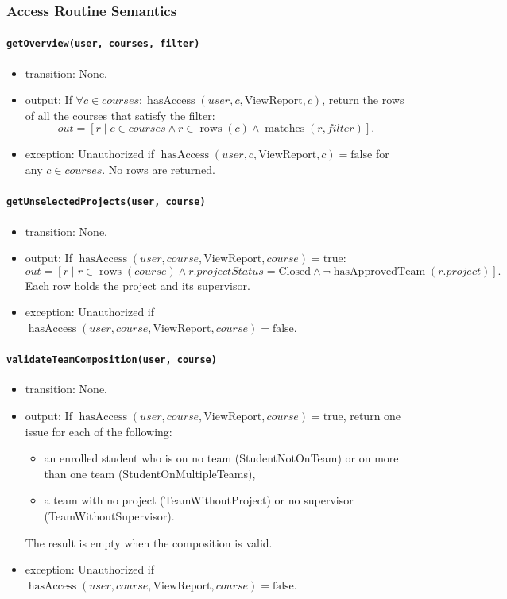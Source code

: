 \documentclass[12pt, titlepage]{article}
\begin{document}
\subsubsection{Access Routine Semantics}

\paragraph{\texttt{getOverview(user, courses, filter)}}
\begin{itemize}
    \item transition: None.
    \item output: If $\forall c\in courses:\operatorname{hasAccess}(user,c,\text{ViewReport},c)$,
    return the rows of all the courses that satisfy the filter:
    \[
        out=[r\mid c\in courses\land r\in\operatorname{rows}(c)\land\operatorname{matches}(r,filter)].
    \]
    \item exception: Unauthorized if $\operatorname{hasAccess}(user,c,\text{ViewReport},c)=\text{false}$
    for any $c\in courses$. No rows are returned.
\end{itemize}

\paragraph{\texttt{getUnselectedProjects(user, course)}}
\begin{itemize}
    \item transition: None.
    \item output: If $\operatorname{hasAccess}(user,course,\text{ViewReport},course)=\text{true}$:
    \[
        out=[r\mid r\in\operatorname{rows}(course)\land r.projectStatus=\text{Closed}\land\neg\operatorname{hasApprovedTeam}(r.project)].
    \]
    Each row holds the project and its supervisor.
    \item exception: Unauthorized if $\operatorname{hasAccess}(user,course,\text{ViewReport},course)=\text{false}$.
\end{itemize}

\paragraph{\texttt{validateTeamComposition(user, course)}}
\begin{itemize}
    \item transition: None.
    \item output: If $\operatorname{hasAccess}(user,course,\text{ViewReport},course)=\text{true}$, return one issue for each of the following:
    \begin{itemize}
        \item an enrolled student who is on no team (StudentNotOnTeam) or on more than one team (StudentOnMultipleTeams),
        \item a team with no project (TeamWithoutProject) or no supervisor (TeamWithoutSupervisor).
    \end{itemize}
    The result is empty when the composition is valid.
    \item exception: Unauthorized if $\operatorname{hasAccess}(user,course,\text{ViewReport},course)=\text{false}$.
\end{itemize}
\end{document}
